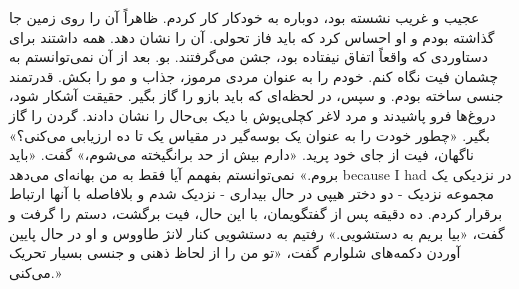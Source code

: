 عجیب و غریب نشسته بود، دوباره به خودکار کار کردم.  
ظاهراً آن را روی زمین جا گذاشته بودم و او احساس کرد که باید  
فاز تحولی.  
آن را نشان دهد. همه داشتند برای دستاوردی که واقعاً اتفاق نیفتاده بود، جشن می‌گرفتند.  
بو.  
بعد از آن نمی‌توانستم به چشمان فیت نگاه کنم. خودم را به عنوان مردی مرموز، جذاب و  
مو را بکش.  
قدرتمند جنسی ساخته بودم. و سپس، در لحظه‌ای که باید  
بازو را گاز بگیر.  
حقیقت آشکار شود، دروغ‌ها فرو پاشیدند و مرد لاغر کچلی‌پوش با دیک بی‌حال را نشان دادند.  
گردن را گاز بگیر.  
«چطور خودت را به عنوان یک بوسه‌گیر در مقیاس یک تا ده ارزیابی می‌کنی؟»  
ناگهان، فیت از جای خود پرید. «دارم بیش از حد برانگیخته می‌شوم،»  
گفت. «باید بروم.»  
نمی‌توانستم بفهمم آیا فقط به من بهانه‌ای می‌دهد because I had  
در نزدیکی یک مجموعه نزدیک - دو دختر هیپی در حال بیداری - نزدیک شدم و بلافاصله  
با آنها ارتباط برقرار کردم. ده دقیقه پس از گفتگویمان، با این حال، فیت برگشت، دستم را گرفت و گفت، «بیا بریم به دستشویی.»  
رفتیم به دستشویی کنار لانژ طاووس و  
او در حال پایین آوردن دکمه‌های شلوارم گفت، «تو من را از لحاظ ذهنی و جنسی بسیار تحریک می‌کنی.»